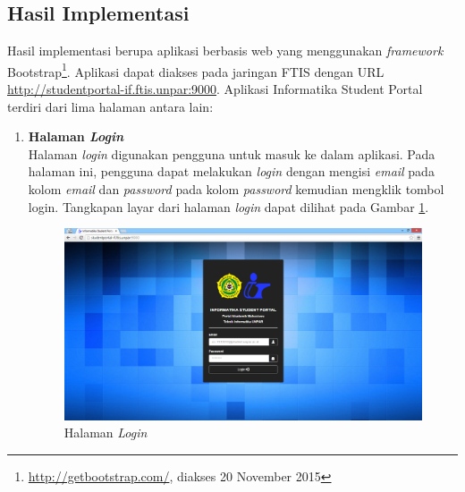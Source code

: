 \subsection{Hasil Implementasi}
				Hasil implementasi berupa aplikasi berbasis web yang menggunakan \textit{framework} Bootstrap\footnote{\url{http://getbootstrap.com/}, diakses 20 November 2015}. Aplikasi dapat diakses pada jaringan FTIS dengan URL \url{http://studentportal-if.ftis.unpar:9000}. Aplikasi Informatika Student Portal terdiri dari lima halaman antara lain:
			\begin{enumerate}	 
				\item\textbf{Halaman \textit{Login}}\\
				Halaman \textit{login} digunakan pengguna untuk masuk ke dalam aplikasi. Pada halaman ini, pengguna dapat melakukan \textit{login} dengan mengisi \textit{email} pada kolom \textit{email} dan \textit{password} pada kolom \textit{password} kemudian mengklik tombol login. Tangkapan layar dari halaman \textit{login} dapat dilihat pada Gambar \ref{fig:5_hasil_login}.
					\begin{figure}[H]
						\centering
						\includegraphics[scale=0.34]{Gambar/hasil_login}
						\caption{Halaman \textit{Login}} 
						\label{fig:5_hasil_login}
					\end{figure}
					

\end{enumerate}
